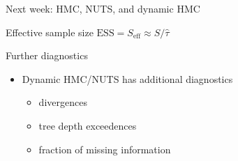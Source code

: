 \documentclass[finnish,english,t]{beamer}
\def\eff{\text{eff}}
\def\ESS{\text{ESS}}
\begin{document}
\begin{frame}
  
   {\Large\color{navyblue} Next week: HMC, NUTS, and dynamic HMC}

   Effective sample size $\ESS = S_\eff \approx S/\hat{\tau}$\\
   
\end{frame}

\begin{frame}
   
   {\Large\color{navyblue} Further diagnostics}

   \begin{itemize}
   \item Dynamic HMC/NUTS has additional diagnostics
     \begin{itemize}
     \item divergences
     \item tree depth exceedences
     \item fraction of missing information
     \end{itemize}
   \end{itemize}
   
 \end{frame}
\end{document}
